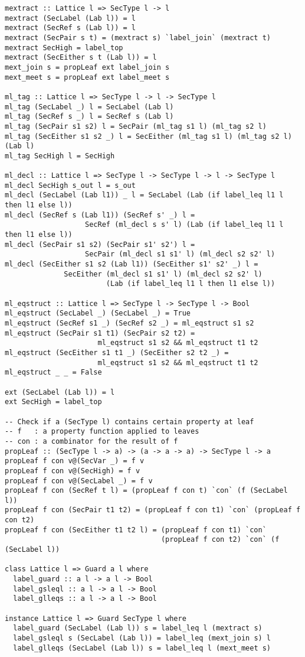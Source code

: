 \begin{Verbatim}[fontsize=\footnotesize,frame=lines,
                 framesep=5mm, label={[Lattice.hs]Lattice.hs}]
mextract :: Lattice l => SecType l -> l
mextract (SecLabel (Lab l)) = l
mextract (SecRef s (Lab l)) = l
mextract (SecPair s t) = (mextract s) `label_join` (mextract t)
mextract SecHigh = label_top
mextract (SecEither s t (Lab l)) = l
mext_join s = propLeaf ext label_join s
mext_meet s = propLeaf ext label_meet s

ml_tag :: Lattice l => SecType l -> l -> SecType l
ml_tag (SecLabel _) l = SecLabel (Lab l)
ml_tag (SecRef s _) l = SecRef s (Lab l)
ml_tag (SecPair s1 s2) l = SecPair (ml_tag s1 l) (ml_tag s2 l)
ml_tag (SecEither s1 s2 _) l = SecEither (ml_tag s1 l) (ml_tag s2 l) (Lab l)
ml_tag SecHigh l = SecHigh

ml_decl :: Lattice l => SecType l -> SecType l -> l -> SecType l
ml_decl SecHigh s_out l = s_out
ml_decl (SecLabel (Lab l1)) _ l = SecLabel (Lab (if label_leq l1 l then l1 else l))
ml_decl (SecRef s (Lab l1)) (SecRef s' _) l = 
                   SecRef (ml_decl s s' l) (Lab (if label_leq l1 l then l1 else l))
ml_decl (SecPair s1 s2) (SecPair s1' s2') l = 
                   SecPair (ml_decl s1 s1' l) (ml_decl s2 s2' l)
ml_decl (SecEither s1 s2 (Lab l1)) (SecEither s1' s2' _) l =
              SecEither (ml_decl s1 s1' l) (ml_decl s2 s2' l) 
                        (Lab (if label_leq l1 l then l1 else l))

ml_eqstruct :: Lattice l => SecType l -> SecType l -> Bool
ml_eqstruct (SecLabel _) (SecLabel _) = True
ml_eqstruct (SecRef s1 _) (SecRef s2 _) = ml_eqstruct s1 s2
ml_eqstruct (SecPair s1 t1) (SecPair s2 t2) = 
                      ml_eqstruct s1 s2 && ml_eqstruct t1 t2
ml_eqstruct (SecEither s1 t1 _) (SecEither s2 t2 _) = 
                      ml_eqstruct s1 s2 && ml_eqstruct t1 t2
ml_eqstruct _ _ = False

ext (SecLabel (Lab l)) = l
ext SecHigh = label_top

-- Check if a (SecType l) contains certain property at leaf 
-- f   : a property function applied to leaves
-- con : a combinator for the result of f
propLeaf :: (SecType l -> a) -> (a -> a -> a) -> SecType l -> a
propLeaf f con v@(SecVar _) = f v
propLeaf f con v@(SecHigh) = f v
propLeaf f con v@(SecLabel _) = f v
propLeaf f con (SecRef t l) = (propLeaf f con t) `con` (f (SecLabel l))
propLeaf f con (SecPair t1 t2) = (propLeaf f con t1) `con` (propLeaf f con t2)
propLeaf f con (SecEither t1 t2 l) = (propLeaf f con t1) `con` 
                                     (propLeaf f con t2) `con` (f (SecLabel l))

class Lattice l => Guard a l where
  label_guard :: a l -> a l -> Bool
  label_gsleql :: a l -> a l -> Bool
  label_glleqs :: a l -> a l -> Bool

instance Lattice l => Guard SecType l where
  label_guard (SecLabel (Lab l)) s = label_leq l (mextract s)
  label_gsleql s (SecLabel (Lab l)) = label_leq (mext_join s) l
  label_glleqs (SecLabel (Lab l)) s = label_leq l (mext_meet s)
\end{Verbatim}
